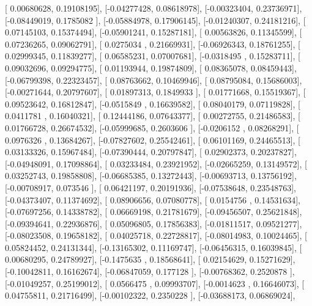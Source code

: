 \documentclass{article}
\begin{document}
       [ 0.00680628,  0.19108195],
       [-0.04277428,  0.08618978],
       [-0.00323404,  0.23736971],
       [-0.08449019,  0.1785082 ],
       [-0.05884978,  0.17906145],
       [-0.01240307,  0.24181216],
       [ 0.07145103,  0.15374494],
       [-0.05901241,  0.15287181],
       [ 0.00563826,  0.11345599],
       [ 0.07236265,  0.09062791],
       [ 0.0275034 ,  0.21669931],
       [-0.06926343,  0.18761255],
       [ 0.02999345,  0.11839277],
       [ 0.06585231,  0.07007681],
       [-0.0318495 ,  0.15283711],
       [ 0.09032696,  0.09294775],
       [ 0.01193944,  0.19874809],
       [ 0.08365078,  0.08459443],
       [-0.06799398,  0.22323457],
       [ 0.08763662,  0.10469946],
       [ 0.08795084,  0.15686003],
       [-0.00271644,  0.20797607],
       [ 0.01897313,  0.1849933 ],
       [ 0.01771668,  0.15519367],
       [ 0.09523642,  0.16812847],
       [-0.0515849 ,  0.16639582],
       [ 0.08040179,  0.07119828],
       [ 0.0411781 ,  0.16040321],
       [ 0.12444186,  0.07643377],
       [ 0.00272755,  0.21486583],
       [ 0.01766728,  0.26674532],
       [-0.05999685,  0.2603606 ],
       [-0.0206152 ,  0.08268291],
       [ 0.0976326 ,  0.13684267],
       [-0.07827602,  0.25542461],
       [ 0.06101169,  0.24465513],
       [ 0.03133326,  0.15967484],
       [-0.07390444,  0.20797847],
       [ 0.02902373,  0.20237827],
       [-0.04948091,  0.17098864],
       [ 0.03233484,  0.23921952],
       [-0.02665259,  0.13149572],
       [ 0.03252743,  0.19858808],
       [-0.06685385,  0.13272443],
       [-0.00693713,  0.13756192],
       [-0.00708917,  0.073546  ],
       [ 0.06421197,  0.20191936],
       [-0.07538648,  0.23548763],
       [-0.04373407,  0.11374692],
       [ 0.08906656,  0.07080778],
       [ 0.0154756 ,  0.14531634],
       [-0.07697256,  0.14338782],
       [ 0.06669198,  0.21781679],
       [-0.09456507,  0.25621848],
       [-0.09394641,  0.22936876],
       [ 0.05096805,  0.17856383],
       [-0.01811517,  0.09521277],
       [-0.08023508,  0.19658182],
       [ 0.04025718,  0.22728817],
       [-0.08014983,  0.10024465],
       [ 0.05824452,  0.24131344],
       [-0.13165302,  0.11169747],
       [-0.06456315,  0.16039845],
       [ 0.00680295,  0.24789927],
       [-0.1475635 ,  0.18568641],
       [ 0.02154629,  0.15271629],
       [-0.10042811,  0.16162674],
       [-0.06847059,  0.177128  ],
       [-0.00768362,  0.2520878 ],
       [-0.01049257,  0.25199012],
       [ 0.0566475 ,  0.09993707],
       [-0.0014623 ,  0.16646073],
       [ 0.04755811,  0.21716499],
       [-0.00102322,  0.2350228 ],
       [-0.03688173,  0.06869024],
\end{document}
